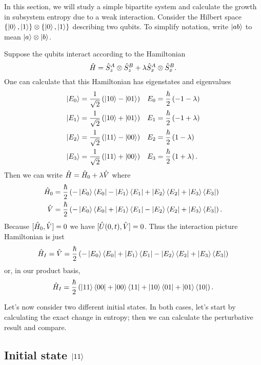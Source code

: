 In this section, we will study a simple bipartite system and calculate the growth in subsystem entropy due to a weak interaction. Consider the Hilbert space \(\{\left|0\right\rangle, \left|1\right\rangle\}\otimes\{\left|0\right\rangle, \left|1\right\rangle\}\) describing two qubits. To simplify notation, write \(\left|ab\right\rangle\) to mean \(\left|a\right\rangle\otimes\left|b\right\rangle\).

Suppose the qubits interact according to the Hamiltonian
\[
\hat{H} = \hat{S}_z^{A}\otimes\hat{S}_z^B + \lambda \hat{S}_x^A \otimes \hat{S}_x^B.
\]
One can calculate that this Hamiltonian has eigenstates and eigenvalues
\begin{align*}
\left|E_0\right\rangle &= \frac{1}{\sqrt{2}} \left(\left|10\right\rangle-\left|01\right\rangle\right) &
E_0 &= \frac{\hbar}{2} \left(-1-\lambda\right) \\
\left|E_1\right\rangle &= \frac{1}{\sqrt{2}} \left(\left|10\right\rangle+\left|01\right\rangle\right) &
E_1 &= \frac{\hbar}{2} \left(-1+\lambda\right) \\
\left|E_2\right\rangle &= \frac{1}{\sqrt{2}} \left(\left|11\right\rangle-\left|00\right\rangle\right) &
E_2 &= \frac{\hbar}{2} \left(1-\lambda\right) \\
\left|E_3\right\rangle &= \frac{1}{\sqrt{2}} \left(\left|11\right\rangle+\left|00\right\rangle\right) &
E_3 &= \frac{\hbar}{2} \left(1+\lambda\right).
\end{align*}
Then we can write \(\hat{H} = \hat{H}_0 + \lambda \hat{V}\) where
\begin{align*}
\hat{H}_0 &= \frac{\hbar}{2} \left(-\left|E_0\right\rangle\left\langle E_0\right| - \left|E_1\right\rangle\left\langle E_1\right| + \left|E_2\right\rangle\left\langle E_2\right| + \left|E_3\right\rangle\left\langle E_3\right|\right) \\
\hat{V} &= \frac{\hbar}{2} \left(-\left|E_0\right\rangle\left\langle E_0\right| + \left|E_1\right\rangle\left\langle E_1\right| - \left|E_2\right\rangle\left\langle E_2\right| + \left|E_3\right\rangle\left\langle E_3\right|\right).
\end{align*}
Because \([\hat{H}_0, \hat{V}] = 0\) we have \([\hat{U}(0, t), \hat{V}] = 0\). Thus the interaction picture Hamiltonian is just
\[\hat{H}_I = \hat{V} = \frac{\hbar}{2} \left(-\left|E_0\right\rangle\left\langle E_0\right| + \left|E_1\right\rangle\left\langle E_1\right| - \left|E_2\right\rangle\left\langle E_2\right| + \left|E_3\right\rangle\left\langle E_3\right|\right)\]
or, in our product basis,
\[
\hat{H}_I = \frac{\hbar}{2} \left(\left|11\right\rangle\left\langle00\right| + \left|00\right\rangle\left\langle11\right| + \left|10\right\rangle\left\langle01\right| + \left|01\right\rangle\left\langle10\right|\right).
\]

Let's now consider two different initial states. In both cases, let's start by calculating the exact change in entropy; then we can calculate the perturbative result and compare.

\subsection{Initial state \(\left|11\right\rangle\)}

